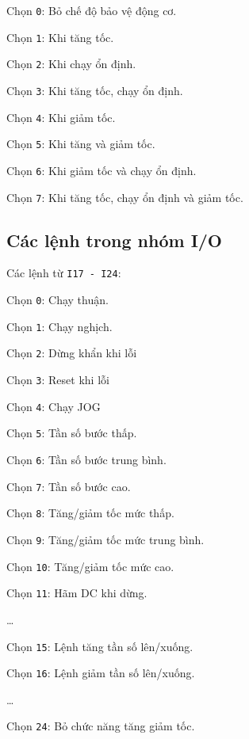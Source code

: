\documentclass[13pt,a4paper]{extarticle}
\begin{document}
\begin{list}{}{}
\begin{list}{+}{}
\begin{multicols}{2}
\item Chọn \verb|0|: Bỏ chế độ bảo vệ động cơ.
\item Chọn \verb|1|: Khi tăng tốc.
\item Chọn \verb|2|: Khi chạy ổn định.
\item Chọn \verb|3|: Khi tăng tốc, chạy ổn định.
\item Chọn \verb|4|: Khi giảm tốc.
\item Chọn \verb|5|: Khi tăng và giảm tốc.
\item Chọn \verb|6|: Khi giảm tốc và chạy ổn định.
\item Chọn \verb|7|: Khi tăng tốc, chạy ổn định và giảm tốc.
\end{multicols}
\end{list}
\end{list}
\subsection{Các lệnh trong nhóm I/O}
Các lệnh từ \verb|I17 - I24|:
\begin{list}{+}{}
\begin{multicols}{2}
\item Chọn \verb|0|: Chạy thuận.
\item Chọn \verb|1|: Chạy nghịch.
\item Chọn \verb|2|: Dừng khẩn khi lỗi
\item Chọn \verb|3|: Reset khi lỗi
\item Chọn \verb|4|: Chạy JOG
\item Chọn \verb|5|: Tần số bước thấp.
\item Chọn \verb|6|: Tần số bước trung bình.
\item Chọn \verb|7|: Tần số bước cao.
\item Chọn \verb|8|: Tăng/giảm tốc mức thấp.
\item Chọn \verb|9|: Tăng/giảm tốc mức trung bình.
\item Chọn \verb|10|: Tăng/giảm tốc mức cao.
\item Chọn \verb|11|: Hãm DC khi dừng.
\item \ldots
\item Chọn \verb|15|: Lệnh tăng tần số lên/xuống.
\item Chọn \verb|16|: Lệnh giảm tần số lên/xuống.
\item \ldots
\item Chọn \verb|24|: Bỏ chức năng tăng giảm tốc.
\end{multicols}
\end{list}
\end{document}
